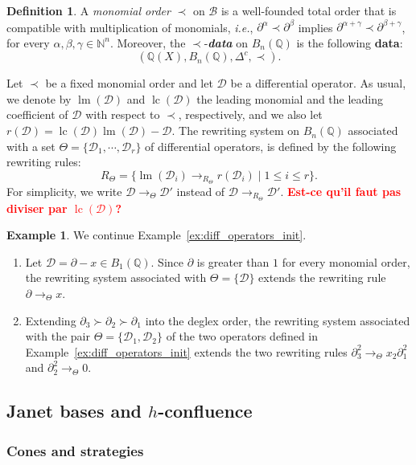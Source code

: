 \documentclass[10pt]{easychair}
\theoremstyle{definition}
\newtheorem{definition}[theorem]{Definition}
\newtheorem{example}[theorem]{Example}
\newcommand\ie{\emph{i.e.}}
\newcommand\todo[1]{{\bf\textcolor{red}{#1}}}
\newcommand\data{{\color{red}\bf data}}
\newcommand\D{\mathcal{D}}
\DeclareMathOperator{\lm}{lm}
\DeclareMathOperator{\lc}{lc}
\newcommand\basis{\mathscr{B}}
\newcommand\Q{\mathbb{Q}}
\newcommand\N{\mathbb{N}}
\newcommand\Weyl[1]{B_{#1}(\Q)}
\newcommand\rewTheta{\to_{\Theta}}
\begin{document}
\begin{definition}
  A {\em monomial order} $\prec$ on $\basis$ is a well-founded total
  order that is compatible with multiplication of monomials, \ie,
  $\partial^{\alpha}\prec\partial^{\beta}$ implies 
  $\partial^{\alpha+\gamma}\prec\partial^{\beta+\gamma}$, for every
  $\alpha,\beta,\gamma\in\N^n$. Moreover, the $\prec$-{\it \data} on
  $\Weyl{n}$ is the following \data:
  \[(\Q(X),\Weyl{n},\Delta^c,\prec).\]
\end{definition}
\smallskip

Let $\prec$ be a fixed monomial order and let $\D$ be a differential
operator. As usual, we denote by $\lm(\D)$ and $\lc(\D)$ the leading
monomial and the leading coefficient of $\D$ with respect to $\prec$,
respectively, and we also let $r(\D)=\lc(\D)\lm(\D)-\D$. The rewriting
system on $\Weyl{n}$ associated with a set $\Theta=\{\D_1,\cdots,\D_r\}$
of differential operators, is defined by the following rewriting rules:
\[R_{\Theta}=\Big\{\lm(\D_i)\to_{R_\Theta}r(\D_i)\mid 1\leq i\leq r
\Big\}.\]
For simplicity, we write $\D\rewTheta\D'$ instead of
$\D\to_{R_\Theta}\D'$. \todo{Est-ce qu'il faut pas diviser par $\lc(\D)$?}
\smallskip

\begin{example}\label{ex:diff_operators_rew}
  We continue Example~\ref{ex:diff_operators_init}.
  \begin{enumerate}
  \item Let $\D=\partial-x\in\Weyl{1}$. Since $\partial$ is greater than
    $1$ for every monomial order, the rewriting system associated with
    $\Theta=\{\D\}$ extends the rewriting rule $\partial\rewTheta x$.
  \item\label{it:Janet_example_rew} Extending
    $\partial_3\succ\partial_2\succ\partial_1$ into the deglex order, the
    rewriting system associated with the pair $\Theta=\{\D_1,\D_2\}$ of
    the two operators defined in Example~\ref{ex:diff_operators_init}
    extends the two rewriting rules
    $\partial_3^2\rewTheta x_2\partial_1^2$ and
    $\partial_2^2\rewTheta 0$.
  \end{enumerate}
\end{example}
\smallskip

\subsection{Janet bases and $h$-confluence}
\label{sec:Janet_bases_and_h_confluence}

\subsubsection{Cones and strategies}
\end{document}
